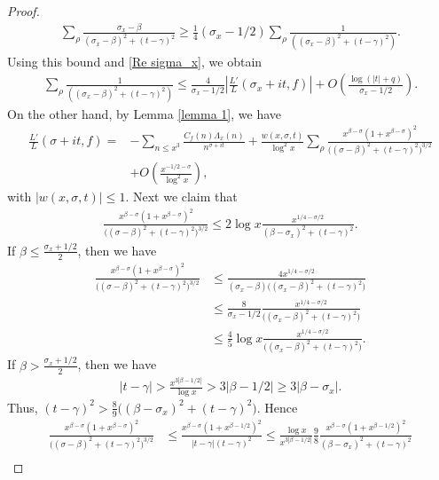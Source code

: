 \documentclass[11pt,reqno]{amsart}
\newcommand{\bea}{\begin{eqnarray}}
\newcommand{\eea}{\end{eqnarray}}
\newcommand{\bna}{\begin{eqnarray*}}
\newcommand{\ena}{\end{eqnarray*}}
\numberwithin{equation}{section}
\theoremstyle{plain}
\theoremstyle{definition}
\begin{document}
\begin{proof}
\bna
\sum_\rho\frac{\sigma_x-\beta}{(\sigma_x-\beta)^2+(t-\gamma)^2}
\geq\frac{1}{4}(\sigma_x-1/2)\sum_\rho\frac{1}
{((\sigma_x-\beta)^2+(t-\gamma)^2)}.
\ena
Using this bound and \eqref{Re sigma_x}, we obtain
\bea\label{step 1}
\sum_\rho\frac{1}{((\sigma_x-\beta)^2+(t-\gamma)^2)}
\leq \frac{4}{\sigma_x-1/2}\left|\frac{L'}{L}(\sigma_x+it,f)\right|
+O\left(\frac{\log(|t|+q)}{\sigma_x-1/2}\right).
\eea
On the other hand, by Lemma \ref{lemma 1}, we have
\begin{equation}\label{step 2}
\begin{split}
\frac{L'}{L}(\sigma+it,f)=&-\sum_{n\leq x^3} \frac{C_f(n)\Lambda_x(n)}{n^{\sigma+it}}
+\frac{w(x,\sigma,t)}{\log^2x}\sum_\rho\frac{x^{\beta-\sigma}(1+x^{\beta-\sigma})^2}
{\big((\sigma-\beta)^2+(t-\gamma)^2\big)^{3/2}}\\
&+O\left(\frac{x^{-1/2-\sigma}}{\log^2x}\right),
\end{split}
\end{equation}
with $|w(x,\sigma,t)|\leq1$.
Next we claim that
\bea\label{claim}
\frac{x^{\beta-\sigma}(1+x^{\beta-\sigma})^2}
{\big((\sigma-\beta)^2+(t-\gamma)^2\big)^{3/2}}
\leq 2\log x\frac{x^{1/4-\sigma/2}}{(\beta-\sigma_x)^2+(t-\gamma)^2}.
\eea
If $\beta\leq \frac{\sigma_x+1/2}{2}$, then we have
\begin{equation*}
\begin{split}
\frac{x^{\beta-\sigma}(1+x^{\beta-\sigma})^2}
{\big((\sigma-\beta)^2+(t-\gamma)^2\big)^{3/2}}&\leq
\frac{4x^{1/4-\sigma/2}}
{(\sigma_x-\beta)\big((\sigma_x-\beta)^2+(t-\gamma)^2\big)}\\
&\leq \frac{8}{\sigma_x-1/2}\frac{x^{1/4-\sigma/2}}
{\big((\sigma_x-\beta)^2+(t-\gamma)^2\big)}\\
&\leq \frac{4}{5}\log x\frac{x^{1/4-\sigma/2}}
{\big((\sigma_x-\beta)^2+(t-\gamma)^2\big)}.
\end{split}
\end{equation*}
If $\beta> \frac{\sigma_x+1/2}{2}$, then we have
\bna
|t-\gamma|>\frac{x^{3|\beta-1/2|}}{\log x}>3|\beta-1/2|\geq 3|\beta-\sigma_x|.
\ena
Thus, $(t-\gamma)^2>\frac{8}{9}\big((\beta-\sigma_x)^2+(t-\gamma)^2\big)$.
Hence
\begin{equation*}
\begin{split}
\frac{x^{\beta-\sigma}(1+x^{\beta-\sigma})^2}
{\big((\sigma-\beta)^2+(t-\gamma)^2\big)^{3/2}}&\leq
\frac{x^{\beta-\sigma}(1+x^{\beta-1/2})^2}
{|t-\gamma|(t-\gamma)^2}
\leq\frac{\log x}{x^{3|\beta-1/2|}}\frac{9}{8}
\frac{x^{\beta-\sigma}(1+x^{\beta-1/2})^2}
{(\beta-\sigma_x)^2+(t-\gamma)^2}\\

\end{split}
\end{equation*}
\end{proof}
\end{document}

